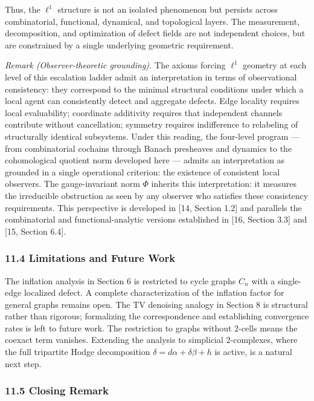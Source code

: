 \documentclass[
]{article}
\begin{document}
Thus, the \(\ell^1\) structure is not an isolated phenomenon but
persists across combinatorial, functional, dynamical, and topological
layers. The measurement, decomposition, and optimization of defect
fields are not independent choices, but are constrained by a single
underlying geometric requirement.

\emph{Remark (Observer-theoretic grounding).} The axioms forcing
\(\ell^1\) geometry at each level of this escalation ladder admit an
interpretation in terms of observational consistency: they correspond to
the minimal structural conditions under which a local agent can
consistently detect and aggregate defects. Edge locality requires local
evaluability; coordinate additivity requires that independent channels
contribute without cancellation; symmetry requires indifference to
relabeling of structurally identical subsystems. Under this reading, the
four-level program --- from combinatorial cochains through Banach
presheaves and dynamics to the cohomological quotient norm developed
here --- admits an interpretation as grounded in a single operational
criterion: the existence of consistent local observers. The
gauge-invariant norm \(\Phi\) inherits this interpretation: it measures
the irreducible obstruction as seen by any observer who satisfies these
consistency requirements. This perspective is developed in {[}14,
Section 1.2{]} and parallels the combinatorial and functional-analytic
versions established in {[}16, Section 3.3{]} and {[}15, Section 6.4{]}.

\subsubsection{11.4 Limitations and Future
Work}\label{limitations-and-future-work}

The inflation analysis in Section 6 is restricted to cycle graphs
\(C_n\) with a single-edge localized defect. A complete characterization
of the inflation factor for general graphs remains open. The TV
denoising analogy in Section 8 is structural rather than rigorous;
formalizing the correspondence and establishing convergence rates is
left to future work. The restriction to graphs without 2-cells means the
coexact term vanishes. Extending the analysis to simplicial 2-complexes,
where the full tripartite Hodge decomposition
\(\delta = d\alpha + \delta\beta + h\) is active, is a natural next
step.

\subsubsection{11.5 Closing Remark}\label{closing-remark}
\end{document}
